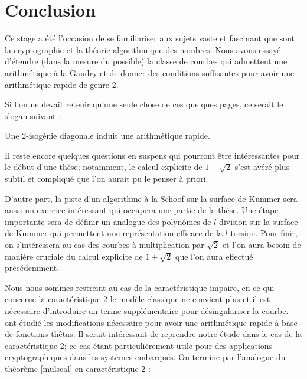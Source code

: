 \documentclass[a4paper,12pt]{article}
\newtheorem{theoreme}{Theorème}[section]
\theoremstyle{definition}
\theoremstyle{remark}
\numberwithin{equation}{section}
\begin{document}
\section{Conclusion}
Ce stage %
a été l'occasion de se familiariser aux sujets vaste et fascinant que sont la cryptographie et la théorie algorithmique des nombres. Nous avons essayé d'étendre (dans la mesure du possible) la classe de courbes qui admettent une arithmétique à la Gaudry et de donner des conditions suffisantes pour avoir une arithmétique rapide de genre 2.

Si l'on ne devait retenir qu'une seule chose de ces quelques pages, ce serait le slogan suivant :
\begin{center}
\huge{Une 2-isogénie diagonale induit une arithmétique rapide.}
\end{center}

Il reste encore quelques questions en suspens qui pourront être intéressantes pour le début d'une thèse; notamment, le calcul explicite de $1+\sqrt{2}$ s'est avéré plus subtil et compliqué que l'on aurait pu le penser à priori.

D'autre part, la piste d'un algorithme à la Schoof sur la surface de Kummer sera aussi un exercice intéressant qui occupera une partie de la thèse. Une étape importante sera de définir un analogue des polynômes de $l$-division sur la surface de Kummer qui permettent une représentation efficace de la $l$-torsion. Pour finir, on s'intéressera au cas des courbes à multiplication par $\sqrt{2}$ et l'on aura besoin de manière cruciale du calcul explicite de $1+\sqrt{2}$ que l'on aura effectué précédemment.

Nous nous sommes restreint au cas de la caractéristique impaire, en ce qui concerne la caractéristique 2 le modèle classique ne convient plus et il est nécessaire d'introduire un terme supplémentaire pour désingulariser la courbe. \citet{lubicz} ont étudié les modifications nécessaire pour avoir une arithmétique rapide à base de fonctions thêtas. Il serait intéressant de reprendre notre étude dans le cas de la caractéristique 2; ce cas étant particulièrement utile pour des applications cryptographiques dans les systèmes embarqués. On termine par l'analogue du théorème \ref{mulscal} en caractéristique 2 :

\end{document}
